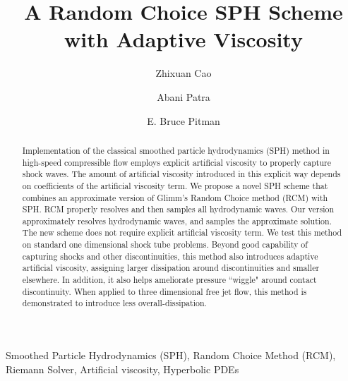 \documentclass[preprint,12pt,authoryear]{elsarticle}
\begin{document}
\begin{frontmatter}
\title{A Random Choice SPH Scheme with Adaptive Viscosity}
\author{Zhixuan Cao}
\address{Fluids Business Unit, Ansys Inc., Lebanon, NH, 03766, USA}
\author{Abani Patra }
\address{Department of Computer Science and Department of Mathematics, Tufts University, Medford, MA, 02153, USA}
\author{E. Bruce Pitman}
\address{Department of Materials Design and Innovation, The State University of New York at Buffalo, Amherst, NY, 14260, USA}

\begin{abstract}
Implementation of the classical smoothed particle hydrodynamics (SPH) method in high-speed compressible flow employs explicit artificial viscosity to properly capture shock waves. The amount of artificial viscosity introduced in this explicit way depends on coefficients of the artificial viscosity term.
We propose a novel SPH scheme that combines an approximate version of Glimm\rq{}s Random Choice method (RCM) with SPH. RCM properly resolves and then samples all hydrodynamic waves. Our version approximately resolves hydrodynamic waves, and samples the approximate solution. The new scheme does not require explicit artificial viscosity term.
We test this method on standard one dimensional shock tube problems. Beyond good capability of capturing shocks and other discontinuities, this method also introduces adaptive artificial viscosity, assigning larger dissipation around discontinuities and smaller elsewhere. In addition, it also helps ameliorate pressure ``wiggle" around contact discontinuity. When applied to three dimensional free jet flow, this method is demonstrated to introduce less overall-dissipation.

\end{abstract}
\begin{keyword}
Smoothed Particle Hydrodynamics (SPH), Random Choice Method (RCM), Riemann Solver, Artificial viscosity, Hyperbolic PDEs
\end{keyword}
\end{frontmatter}
\end{document}
